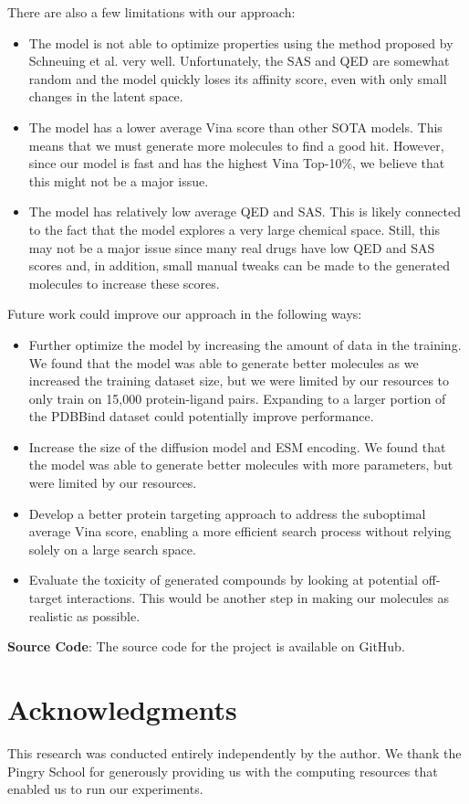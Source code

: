 \documentclass[11pt]{article}
\begin{document}
There are also a few limitations with our approach:
\begin{itemize}
    \item The model is not able to optimize properties using the method proposed by 
          Schneuing et al. \cite{schneuing2023} very well. Unfortunately, the SAS and 
          QED are somewhat random and the model quickly loses its affinity score, even with 
          only small changes in the latent space.
    \item The model has a lower average Vina score than other SOTA models. This means that 
          we must generate more molecules to find a good hit. However, since our model is 
          fast and has the highest Vina Top-10\%, we believe that this might not be a major issue.
    \item The model has relatively low average QED and SAS. This is likely connected to the fact 
          that the model explores a very large chemical space. Still, this may not be a major issue 
          since many real drugs have low QED and SAS scores and, in addition, small manual tweaks 
          can be made to the generated molecules to increase these scores.
\end{itemize} 


Future work could improve our approach in the following ways:
\begin{itemize}
    \item Further optimize the model by increasing the amount of data in the training. We found that 
          the model was able to generate better molecules as we increased the training dataset size, 
          but we were limited by our resources to only train on 15,000 protein-ligand pairs. Expanding to 
          a larger portion of the PDBBind dataset could potentially improve performance.
    \item Increase the size of the diffusion model and ESM encoding. We found that the model was able to 
          generate better molecules with more parameters, but were limited by our resources. 
    \item Develop a better protein targeting approach to address the suboptimal average Vina score, enabling 
          a more efficient search process without relying solely on a large search space.
    \item Evaluate the toxicity of generated compounds by looking at potential off-target interactions. This would 
          be another step in making our molecules as realistic as possible.
\end{itemize}

\textbf{Source Code}: The source code for the project is available on GitHub.

\section{Acknowledgments}
This research was conducted entirely independently by the author.
We thank the Pingry School for generously providing us with 
the computing resources that enabled us to run our experiments.





\end{document}
